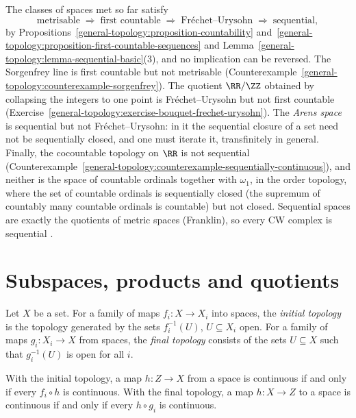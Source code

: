 \begin{remark}\label{general-topology:remark-sequential-hierarchy}
The classes of spaces met so far satisfy
\[
\text{metrisable} \;\Longrightarrow\; \text{first countable} \;\Longrightarrow\; \text{Fr\'echet--Urysohn} \;\Longrightarrow\; \text{sequential},
\]
by Propositions~\ref{general-topology:proposition-countability} and~\ref{general-topology:proposition-first-countable-sequences} and Lemma~\ref{general-topology:lemma-sequential-basic}(3), and no implication can be
reversed. The Sorgenfrey line is first countable but not metrisable (Counterexample~\ref{general-topology:counterexample-sorgenfrey}). The quotient $\RR/\ZZ$ obtained by collapsing the integers to one point is Fr\'echet--Urysohn
but not first countable (Exercise~\ref{general-topology:exercise-bouquet-frechet-urysohn}). The \emph{Arens space} is sequential but not Fr\'echet--Urysohn: in it the sequential closure of a set need not be sequentially closed,
and one must iterate it, transfinitely in general. Finally, the cocountable topology on $\RR$ is not sequential (Counterexample~\ref{general-topology:counterexample-sequentially-continuous}), and neither is the space of
countable ordinals together with $\omega_1$, in the order topology, where the set of countable ordinals is sequentially closed (the supremum of countably many countable ordinals is countable) but not closed. Sequential spaces
are exactly the quotients of metric spaces (Franklin), so every CW complex is sequential \cite{engelking-general-topology}.
\end{remark}

\section{Subspaces, products and quotients}\label{general-topology:section-constructions}

\begin{definition}\label{general-topology:definition-initial-final}
Let $X$ be a set. For a family of maps $f_i \colon X \to X_i$ into spaces, the \emph{initial topology} is the topology generated by the sets
$f_i^{-1}(U)$, $U \subseteq X_i$ open. For a family of maps $g_i \colon X_i \to X$ from spaces, the \emph{final topology} consists of the sets
$U \subseteq X$ such that $g_i^{-1}(U)$ is open for all $i$.
\end{definition}

\begin{proposition}\label{general-topology:proposition-initial-final}
With the initial topology, a map $h \colon Z \to X$ from a space is continuous if and only if every $f_i \circ h$ is continuous. With the
final topology, a map $h \colon X \to Z$ to a space is continuous if and only if every $h \circ g_i$ is continuous.
\end{proposition}

